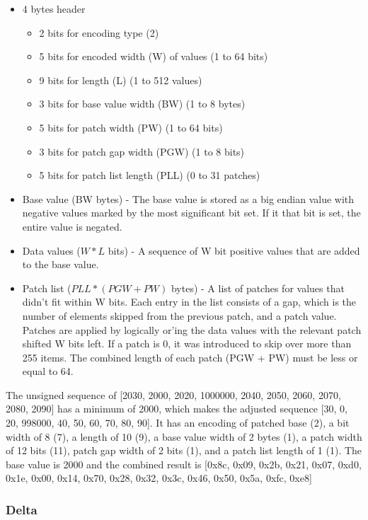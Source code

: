 \documentclass{article}
\begin{document}
\begin{itemize}
\item 4 bytes header
  \begin{itemize}
  \item 2 bits for encoding type (2)
  \item 5 bits for encoded width (W) of values (1 to 64 bits)
  \item 9 bits for length (L) (1 to 512 values)
  \item 3 bits for base value width (BW) (1 to 8 bytes)
  \item 5 bits for patch width (PW) (1 to 64 bits)
  \item 3 bits for patch gap width (PGW) (1 to 8 bits)
  \item 5 bits for patch list length (PLL) (0 to 31 patches)
  \end{itemize}
\item Base value (BW bytes) - The base value is stored as a big endian value 
  with negative values marked by the most significant bit set. If it that
  bit is set, the entire value is negated.
\item Data values ($W * L$ bits) - A sequence of W bit positive values that
  are added to the base value.
\item Patch list ($PLL * (PGW + PW)$ bytes) - A list of patches for
  values that didn't fit within W bits. Each entry in the list
  consists of a gap, which is the number of elements skipped from the
  previous patch, and a patch value. Patches are applied by logically
  or'ing the data values with the relevant patch shifted W bits
  left. If a patch is 0, it was introduced to skip over more than 255
  items. The combined length of each patch (PGW + PW) must be less or
  equal to 64.
\end{itemize}

The unsigned sequence of [2030, 2000, 2020, 1000000, 2040, 2050, 2060,
  2070, 2080, 2090] has a minimum of 2000, which makes the adjusted
sequence [30, 0, 20, 998000, 40, 50, 60, 70, 80, 90]. It has an
encoding of patched base (2), a bit width of 8 (7), a length of 10
(9), a base value width of 2 bytes (1), a patch width of 12 bits (11),
patch gap width of 2 bits (1), and a patch list length of 1 (1). The
base value is 2000 and the combined result is [0x8c, 0x09, 0x2b, 0x21,
  0x07, 0xd0, 0x1e, 0x00, 0x14, 0x70, 0x28, 0x32, 0x3c, 0x46, 0x50,
  0x5a, 0xfc, 0xe8]

\subsubsection{Delta}
\end{document}
